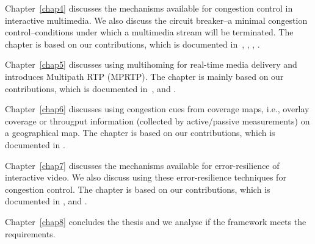 Chapter~\ref{chap4} discusses the mechanisms available for congestion control
in interactive multimedia. We also discuss the circuit breaker--a minimal
congestion control--conditions under which a multimedia stream will be
terminated. The chapter is based on our contributions, which is documented
in~\cite{draft.rtp.cb, control.loops.api}, , ,
.


Chapter~\ref{chap5} discusses using multihoming for real-time media delivery
and introduces Multipath RTP (MPRTP). The chapter is mainly based on our
contributions, which is documented in~\cite{draft.mprtp, draft.mprtp.sdp,
globisch2011architecture, draft.rtcp.overlay}, and .


Chapter~\ref{chap6} discusses using congestion cues from coverage maps, i.e.,
overlay coverage or througput information (collected by active/passive
measurements) on a geographical map. The chapter is based on our contributions, 
which is documented in .


Chapter~\ref{chap7} discusses the mechanisms available for error-resilience
of interactive video. We also discuss using these error-resilience techniques
for congestion control. The chapter is based on our contributions, which is
documented in , and .

Chapter~\ref{chap8} concludes the thesis and we analyse if the framework meets
the requirements.









